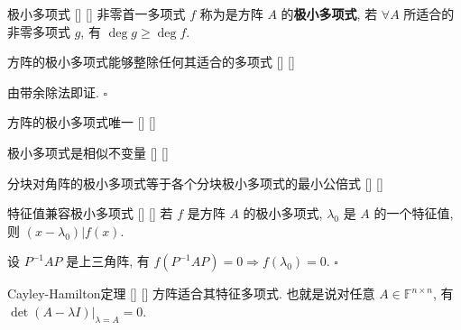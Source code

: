 \documentclass[UTF8]{ctexart}
\DeclareMathOperator{\0}{\mathbf{0}}
\DeclareMathOperator{\<}{\langle}
\renewcommand{\>}{\rangle}
\begin{document}
		\begin{dfn}
			[]
			{极小多项式}
			[]
			[]
			非零首一多项式 \(f\) 称为是方阵 \(A\) 的\textbf{极小多项式}, 若 \(\forall A\) 所适合的非零多项式 \(g\), 有 \(\deg g\geq\deg f\). 
		\end{dfn}
		
		\begin{ppt}
			[]
			{方阵的极小多项式能够整除任何其适合的多项式}
			[]
			[]
		\end{ppt}

		\begin{prf}
			由带余除法即证.  \(\square\) 
		\end{prf}

		\begin{ppt}
			[]
			{方阵的极小多项式唯一}
			[]
			[]
		\end{ppt}
		
		\begin{ppt}
			[]
			{极小多项式是相似不变量}
			[]
			[]
		\end{ppt}
		
		\begin{ppt}
			[]
			{分块对角阵的极小多项式等于各个分块极小多项式的最小公倍式}
			[]
			[]
		\end{ppt}
		
		\begin{ppt}
			[]
			{特征值兼容极小多项式}
			[]
			[]
			若 \(f\) 是方阵 \(A\) 的极小多项式,  \(\lambda_0\) 是 \(A\) 的一个特征值, 则 \((x-\lambda_0)|f(x)\). 
		\end{ppt}

		\begin{prf}
			设 \(P^{-1}AP\) 是上三角阵, 有 \(f(P^{-1}AP)=0\Longrightarrow f(\lambda_0)=0\).  \(\square\) 
		\end{prf}
		
		\begin{thm}
			[]
			{Cayley-Hamilton定理}
			[]
			[]
			方阵适合其特征多项式. 也就是说对任意 \(A\in\mathbb{F}^{n\times n}\), 有 \(\det(A-\lambda I)|_{\lambda=A}=0\).
		\end{thm}
\end{document}

